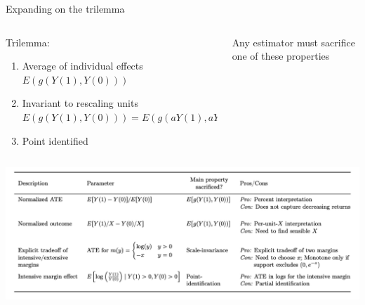 \documentclass[notes,11pt, aspectratio=169]{beamer}
\newenvironment{wideitemize}{\itemize\addtolength{\itemsep}{10pt}}{\enditemize}
\begin{document}
  \begin{frame}{Expanding on the trilemma}
    \begin{columns}[T] %
      \begin{column}{.65\textwidth}
    \begin{wideitemize}
     \item Trilemma:
  \begin{enumerate}
    \item Average of individual effects $E(g(Y(1), Y(0)))$
    \item Invariant to rescaling units
    $E(g(Y(1), Y(0))) = E(g(aY(1), aY(0)))$
    \item Point identified
  \end{enumerate}
    \end{wideitemize}
      \end{column}%
    \hfill%
    \begin{column}{.3\textwidth}
      \begin{wideitemize}
        \item Any estimator must sacrifice one of these properties
       \end{wideitemize}
    \end{column}
  \end{columns}
  \includegraphics[width=\linewidth]{images/chenroth2.png}
  \end{frame}
\end{document}
